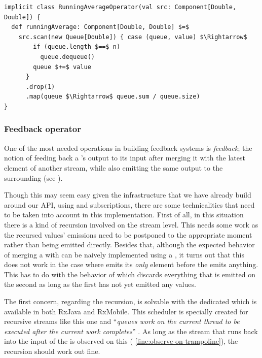 \begin{minipage}{\linewidth}
\begin{lstlisting}[style=ScalaStyle, caption={Implementation of \code{RunningAverage} using the new Rx style operators}, label={lst:running-average-with-operators}]
implicit class RunningAverageOperator(val src: Component[Double, Double]) {
  def runningAverage: Component[Double, Double] $=$
    src.scan(new Queue[Double]) { case (queue, value) $\Rightarrow$
        if (queue.length $==$ n)
          queue.dequeue()
        queue $+=$ value
      }
      .drop(1)
      .map(queue $\Rightarrow$ queue.sum / queue.size)
}
\end{lstlisting}
\end{minipage}

\subsubsection{Feedback operator}
One of the most needed operations in building feedback systems is \textit{feedback}; the notion of feeding back a \comp's output to its input after merging it with the latest element of another stream, while also emitting the same output to the surrounding \comp (see ).

Though this may seem easy given the infrastructure that we have already build around our API, using  and subscriptions, there are some technicalities that need to be taken into account in this implementation. First of all, in this situation there is a kind of recursion involved on the stream level. This needs some work as the recursed values' emissions need to be postponed to the appropriate moment rather than being emitted directly. Besides that, although the expected behavior of merging a \comp with  can be naively implemented using a , it turns out that this does not work in the case where  emits its \emph{only} element before the \comp emits anything. This has to do with the behavior of  which discards everything that is emitted on the second \obs as long as the first \obs has not yet emitted any values.

The first concern, regarding the recursion, is solvable with the dedicated  which is available in both RxJava and RxMobile. This scheduler is specially created for recursive streams like this one and ``\textit{queues work on the current thread to be executed after the current work completes}'' \cite{RxJava-Trampoline-Scheduler}. As long as the stream that runs back into the input of the \comp is observed on this \sch ( \cref{line:observe-on-trampoline}), the recursion should work out fine.

